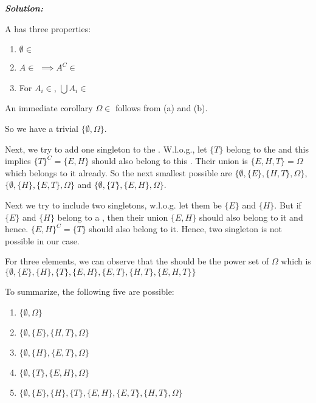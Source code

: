 \documentclass[12pt, oneside]{article}
\begin{document}
\begin{enumerate}


\textbf{\textit{Solution:}}

A \sigmafield \sfield{} has three properties:
\begin{enumerate}
    \item $\emptyset \in$ \sfield{} \\
    \item $A \in$ \sfield{} $\implies A^C \in$ \sfield{} \\
    \item For $A_i\in$\sfield{}, $\bigcup A_i \in $ \sfield{}
\end{enumerate}
An immediate corollary $\Omega\in$\sfield{} follows from (a) and (b).

So we have a trivial \sigmafield $\{\emptyset,\Omega\}$.

Next, we try to add one singleton to the \sigmafield. W.l.o.g., let $\{T\}$ belong to the \sigmafield and this implies $\{T\}^C = \{E,H\}$ should also belong to this \sigmafield. Their union is $\{E,H,T\} = \Omega$  which belongs to it already. So the next smallest \sigmafield possible are $\{\emptyset,\{E\},\{H,T\},\Omega\}$, $\{\emptyset,\{H\},\{E,T\},\Omega\}$ and $\{\emptyset,\{T\},\{E,H\},\Omega\}$.

Next we try to include two singletons, w.l.o.g. let them be $\{E\}$ and $\{H\}$. But if $\{E\}$ and $\{H\}$ belong to a \sigmafield, then their union $\{E,H\}$ should also belong to it and hence. $\{E,H\}^C = \{T\}$ should also belong to it. Hence, two singleton is not possible in our case.

For three elements, we can observe that the \sigmafield should be the power set of $\Omega$ which is $\{\emptyset,\{E\},\{H\},\{T\},\{E,H\},\{E,T\}, \{H,T\},\{E,H,T\}\}$

To summarize, the following five \sigmafield are possible:
\begin{enumerate}[label=(\roman*)]
\item $\{\emptyset,\Omega\}$ \\
\item $\{\emptyset,\{E\},\{H,T\},\Omega\}$ \\
\item $\{\emptyset,\{H\},\{E,T\},\Omega\}$ \\
\item $\{\emptyset,\{T\},\{E,H\},\Omega\}$
\item $\{\emptyset,\{E\},\{H\},\{T\},\{E,H\},\{E,T\}, \{H,T\},\Omega\}$


\end{enumerate}
\end{enumerate}
\end{document}
